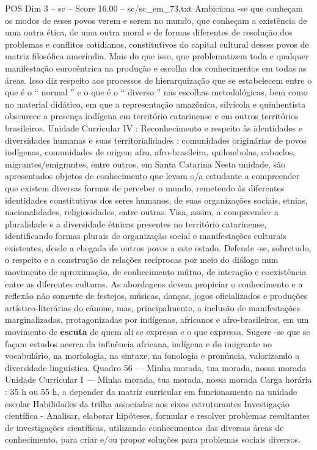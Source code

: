 \begin{textsample}{POS Dim 3 – sc – Score 16.00 – sc/sc\_em\_73.txt}
Ambiciona -se que conheçam os modos de esses povos verem e serem no mundo, que conheçam a existência de uma outra ética, de uma outra moral e de formas diferentes de resolução dos problemas e conflitos cotidianos, constitutivos do capital cultural desses povos de matriz filosófica ameríndia.
Mais do que isso, que problematizem toda e qualquer manifestação eurocêntrica na produção e escolha dos conhecimentos em todas as áreas.
Isso diz respeito aos processos de hierarquização que se estabelecem entre o que é o “ normal ” e o que é o “ diverso ” nas escolhas metodológicas, bem como no material didático, em que a representação amazônica, silvícola e quinhentista obscurece a presença indígena em território catarinense e em outros territórios brasileiros.
Unidade Curricular IV : Reconhecimento e respeito às identidades e diversidades humanas e suas territorialidades : comunidades originárias de povos indígenas, comunidades de origem afro, afro-brasileira, quilombolas, caboclos, migrantes/emigrantes, entre outros, em Santa Catarina Nesta unidade, são apresentados objetos de conhecimento que levam o/a estudante a compreender que existem diversas formas de perceber o mundo, remetendo às diferentes identidades constitutivas dos seres humanos, de suas organizações sociais, etnias, nacionalidades, religiosidades, entre outras.
Visa, assim, a compreender a pluralidade e a diversidade étnicas presentes no território catarinense, identificando formas plurais de organização social e manifestações culturais existentes, desde a chegada de outros povos a este estado.
Defende -se, sobretudo, o respeito e a construção de relações recíprocas por meio do diálogo num movimento de aproximação, de conhecimento mútuo, de interação e coexistência entre as diferentes culturas.
As abordagens devem propiciar o conhecimento e a reflexão não somente de festejos, músicas, danças, jogos oficializados e produções artístico-literárias do cânone, mas, principalmente, a inclusão de manifestações marginalizadas, protagonizadas por indígenas, africanos e afro-brasileiros, em um movimento de \textbf{escuta} de quem ali se expressa e o que expressa.
Sugere -se que se façam estudos acerca da influência africana, indígena e do imigrante no vocabulário, na morfologia, na sintaxe, na fonologia e pronúncia, valorizando a diversidade linguística.
Quadro 56 — Minha morada, tua morada, nossa morada Unidade Curricular I — Minha morada, tua morada, nossa morada Carga horária : 35 h ou 55 h, a depender da matriz curricular em funcionamento na unidade escolar Habilidades da trilha associadas aos eixos estruturantes Investigação científica - Analisar, elaborar hipóteses, formular e resolver problemas resultantes de investigações científicas, utilizando conhecimentos das diversas áreas de conhecimento, para criar e/ou propor soluções para problemas sociais diversos.

\end{textsample}
